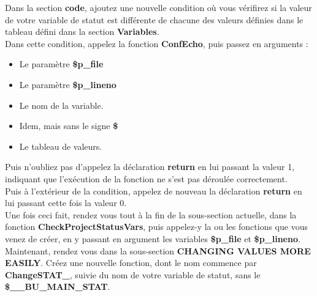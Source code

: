 \documentclass[a4paper,10pt]{article}
\begin{document}
Dans la section \textbf{code}, ajoutez une nouvelle condition où vous vérifirez si la valeur de votre variable de statut est différente de chacune des valeurs définies dans le tableau défini dans la section \textbf{Variables}.\\[1\baselineskip]

Dans cette condition, appelez la fonction \textbf{\color{mauve}ConfEcho}, puis passez en arguments :
\begin{itemize}
    \item Le paramètre \textbf{\color{orange}\$p\_file}\\[1\baselineskip]

    \item Le paramètre \textbf{\color{orange}\$p\_lineno}\\[1\baselineskip]

    \item Le nom de la variable.\\[1\baselineskip]

    \item Idem, mais sans le signe \textbf{\$}\\[1\baselineskip]

    \item Le tableau de valeurs.\\[1\baselineskip]
\end{itemize}

Puis n'oubliez pas d'appelez la déclaration \textbf{\color{gray}return} en lui passant la valeur 1, indiquant que l'exécution de la fonction ne s'est pas déroulée correctement.\\[1\baselineskip]

Puis à l'extérieur de la condition, appelez de nouveau la déclaration \textbf{\color{gray}return} en lui passant cette fois la valeur 0.\\[1\baselineskip]

Une fois ceci fait, rendez vous tout à la fin de la sous-section actuelle, dans la fonction \textbf{\color{mauve}CheckProjectStatusVars}, puis appelez-y la ou les fonctions que vous venez de créer, en y passant en argument les variables \textbf{\color{orange}\$p\_file} et \textbf{\color{orange}\$p\_lineno}.\\[2\baselineskip]


Maintenant, rendez vous dans la sous-section \textbf{CHANGING VALUES MORE EASILY}. Créez une nouvelle fonction, dont le nom commence par \textbf{\color{mauve}ChangeSTAT\_}, suivie du nom de votre variable de statut, sans le \textbf{\color{orange}\$\_\_BU\_MAIN\_STAT}.\\[1\baselineskip]
\end{document}
